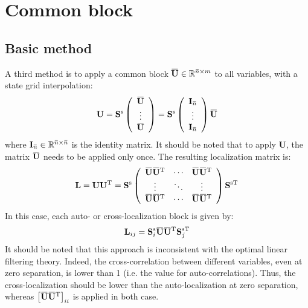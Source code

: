 \documentclass[12pt]{scrartcl}
\newcommand{\overbar}[1]{\mkern 1.5mu\overline{\mkern-1.5mu#1\mkern-1.5mu}\mkern 1.5mu}
\begin{document}
\section{Common block}

\subsection{Basic method}
A third method is to apply a common block $\overbar{\mathbf{U}} \in \mathbb{R}^{\overbar{n} \times m}$ to all variables, with a state grid interpolation:
\begin{align}
\mathbf{U} = \mathbf{S}^\mathrm{s} \left( \begin{array}{c}
\overbar{\mathbf{U}} \\
\vdots \\
\overbar{\mathbf{U}}
\end{array} \right) = \mathbf{S}^\mathrm{s} \left( \begin{array}{c}
\mathbf{I}_{\overbar{n}} \\
\vdots \\
\mathbf{I}_{\overbar{n}} \\
\end{array} \right) \overbar{\mathbf{U}}
\end{align}
where $\mathbf{I}_{\overbar{n}} \in \mathbb{R}^{\overbar{n} \times \overbar{n}}$ is the identity matrix. It should be noted that to apply $\mathbf{U}$, the matrix $\overbar{\mathbf{U}}$ needs to be applied only once. The resulting localization matrix is:
\begin{align}
\mathbf{L} = \mathbf{U} \mathbf{U}^\mathrm{T} = \mathbf{S}^\mathrm{s} \left( \begin{array}{ccc}
\overbar{\mathbf{U}} \overbar{\mathbf{U}}^\mathrm{T} & \cdots & \overbar{\mathbf{U}} \overbar{\mathbf{U}}^\mathrm{T} \\
\vdots & \ddots & \vdots  \\
\overbar{\mathbf{U}} \overbar{\mathbf{U}}^\mathrm{T} & \cdots & \overbar{\mathbf{U}} \overbar{\mathbf{U}}^\mathrm{T}
\end{array} \right) \mathbf{S}^{\mathrm{s} \mathrm{T}}
\end{align}
In this case, each auto- or cross-localization block is given by: 
\begin{align}
\mathbf{L}_{ij} = \mathbf{S}^\mathrm{s}_i \overbar{\mathbf{U}} \overbar{\mathbf{U}}^\mathrm{T} \mathbf{S}_j^{\mathrm{s} \mathrm{T}}
\end{align}
It should be noted that this approach is inconsistent with the optimal linear filtering theory. Indeed, the cross-correlation between different variables, even at zero separation, is lower than 1 (i.e. the value for auto-correlations). Thus, the cross-localization should be lower than the auto-localization at zero separation, whereas $\left[\overbar{\mathbf{U}} \overbar{\mathbf{U}}^\mathrm{T}\right]_{ii}$ is applied in both case.\\
\end{document}
